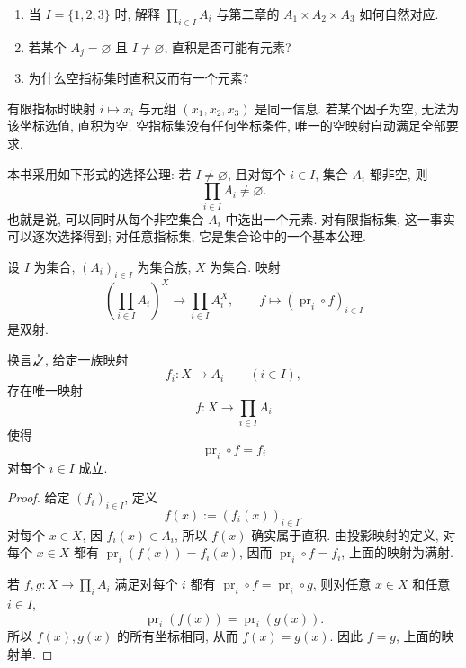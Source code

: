 \documentclass[usesamecnt, thmcnt=section, lang=cn, newtx, 10pt, scheme=chinese]{elegantbook}
\begin{document}
\begin{concept}\label{con:corr-11}
\begin{enumerate}[label=\rm(\arabic*)]
  \item 当 $I=\{1,2,3\}$ 时, 解释 $\prod_{i\in I}A_i$ 与第二章的 $A_1\times A_2\times A_3$ 如何自然对应.
  \item 若某个 $A_j=\varnothing$ 且 $I\neq\varnothing$, 直积是否可能有元素?
  \item 为什么空指标集时直积反而有一个元素?
\end{enumerate}
\end{concept}

\begin{solution}
有限指标时映射 $i\mapsto x_i$ 与元组 $(x_1,x_2,x_3)$ 是同一信息. 若某个因子为空, 无法为该坐标选值, 直积为空. 空指标集没有任何坐标条件, 唯一的空映射自动满足全部要求.
\end{solution}

\begin{knowledge}[选择公理]
本书采用如下形式的选择公理: 若 $I\neq\varnothing$, 且对每个 $i\in I$, 集合 $A_i$ 都非空, 则
\[
 \prod_{i\in I}A_i\neq\varnothing.
\]
也就是说, 可以同时从每个非空集合 $A_i$ 中选出一个元素. 对有限指标集, 这一事实可以逐次选择得到; 对任意指标集, 它是集合论中的一个基本公理.
\end{knowledge}

\begin{proposition}\label{prop:corr-product-universal}
设 $I$ 为集合, $(A_i)_{i\in I}$ 为集合族, $X$ 为集合. 映射
\[
 \left(\prod_{i\in I}A_i\right)^X
 \longrightarrow
 \prod_{i\in I}A_i^X,
 \qquad
 f\longmapsto(\operatorname{pr}_i\circ f)_{i\in I}
\]
是双射.

换言之, 给定一族映射
\[
 f_i:X\to A_i\qquad(i\in I),
\]
存在唯一映射
\[
 f:X\longrightarrow\prod_{i\in I}A_i
\]
使得
\[
 \operatorname{pr}_i\circ f=f_i
\]
对每个 $i\in I$ 成立.
\end{proposition}

\begin{proof}
给定 $(f_i)_{i\in I}$, 定义
\[
 f(x):=(f_i(x))_{i\in I}.
\]
对每个 $x\in X$, 因 $f_i(x)\in A_i$, 所以 $f(x)$ 确实属于直积. 由投影映射的定义, 对每个 $x\in X$ 都有 $\operatorname{pr}_i(f(x))=f_i(x)$, 因而 $\operatorname{pr}_i\circ f=f_i$, 上面的映射为满射.

若 $f,g:X\to\prod_iA_i$ 满足对每个 $i$ 都有 $\operatorname{pr}_i\circ f=\operatorname{pr}_i\circ g$, 则对任意 $x\in X$ 和任意 $i\in I$,
\[
 \operatorname{pr}_i(f(x))=\operatorname{pr}_i(g(x)).
\]
所以 $f(x),g(x)$ 的所有坐标相同, 从而 $f(x)=g(x)$. 因此 $f=g$, 上面的映射单.
\end{proof}
\end{document}
